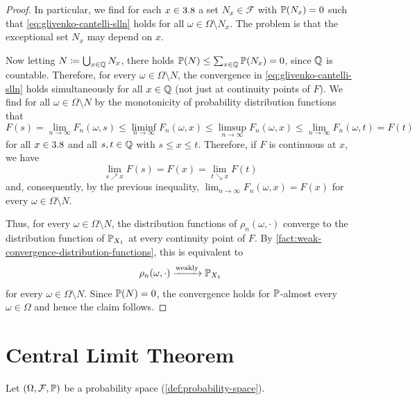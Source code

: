 \begin{proof}
In particular, we find for each \(x\in3.8\) a set \(N_x\in\mathcal{F}\) with
\(\mathbb{P}(N_x)=0\) such that \eqref{eq:glivenko-cantelli-slln} holds for all
\(\omega\in\Omega\setminus N_x\). 
The problem is that the exceptional set \(N_x\) may depend on \(x\).

Now letting
\(
N
\coloneq
\bigcup_{x\in\mathbb{Q}}N_x 
\),
there holds \(\mathbb{P}(N) \leq \sum_{x\in\mathbb{Q}}\mathbb{P}(N_x)=0\), since \(\mathbb{Q}\) is countable.
Therefore, for every \(\omega \in \Omega\setminus N\), the convergence in \eqref{eq:glivenko-cantelli-slln} holds simultaneously for all \(x\in\mathbb{Q}\) (not just at continuity points of \(F\)).
We find for all \(\omega\in\Omega\setminus N\) by the monotonicity of probability distribution functions that
\[
F(s)
=
\lim_{n\to\infty}F_n(\omega,s)
\leq
\liminf_{n\to\infty}F_n(\omega,x)
\leq
\limsup_{n\to\infty}F_n(\omega,x)
\leq
\lim_{n\to\infty}F_n(\omega,t)
=
F(t)
\]
for all \(x\in3.8\) and all \(s,t\in\mathbb{Q}\) with \(s\leq x\leq t\).
Therefore, if \(F\) is continuous at \(x\), we have
\[
\lim_{s\nearrow x}F(s)
=
F(x)
=
\lim_{t\searrow x}F(t)
\]
and, consequently, by the previous inequality,
\(
\lim_{n\to\infty}F_n(\omega,x)
=
F(x)
\) for every \(\omega\in\Omega\setminus N\).

Thus, for every \(\omega\in\Omega\setminus N\), the distribution functions of
\(\rho_n(\omega,\cdot)\) converge to the distribution function of \(\mathbb{P}_{X_1}\)
at every continuity point of \(F\).
By \autoref{fact:weak-convergence-distribution-functions}, this is equivalent to
\[
\rho_n(\omega,\cdot)
\xrightarrow{\text{weakly}}
\mathbb{P}_{X_1}
\]
for every \(\omega\in\Omega\setminus N\).
Since \(\mathbb{P}(N)=0\), the convergence holds for \(\mathbb{P}\)-almost every \(\omega\in\Omega\) and hence
the claim follows. 
\end{proof}



\clearpage

\section{Central Limit Theorem}\label{sec:central-limit-theorem}
Let $(\Omega,\mathcal{F},\mathbb{P})$ be a probability space (\autoref{def:probability-space}).



